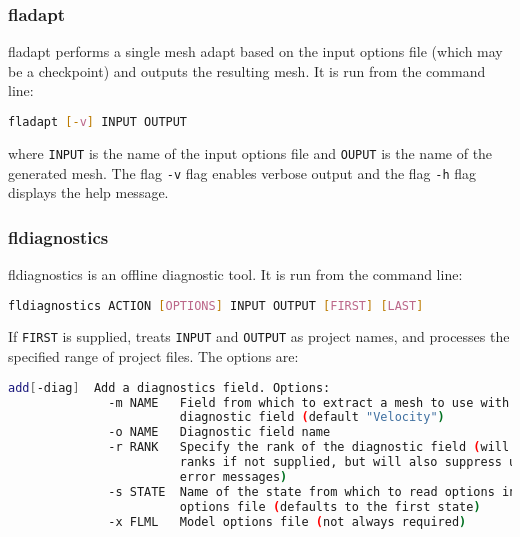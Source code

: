 
\subsubsection{fladapt}
\label{sect:fladapt}
fladapt performs a single mesh adapt based on the input options file (which may be a checkpoint) and outputs the resulting mesh. It is run from the command line:

\begin{lstlisting}[language = Bash]
fladapt [-v] INPUT OUTPUT
\end{lstlisting}
where \lstinline[language = Bash]+INPUT+ is the name of the input options file and \lstinline[language = Bash]+OUPUT+ is the name of the generated mesh. The flag \lstinline[language = Bash]+-v+ flag enables verbose output and the flag \lstinline[language = Bash]+-h+ flag displays the help message.


\subsubsection{fldiagnostics}
\label{sect:fldiagnostics}
fldiagnostics is an offline diagnostic tool. It is run from the command line:

\begin{lstlisting}[language = Bash]
fldiagnostics ACTION [OPTIONS] INPUT OUTPUT [FIRST] [LAST]
\end{lstlisting}

If \lstinline[language = Bash]+FIRST+ is supplied, treats \lstinline[language = Bash]+INPUT+ and \lstinline[language = Bash]+OUTPUT+ as project names, and processes the specified range of project files. The options are:
\begin{lstlisting}[language = Bash]
add[-diag]  Add a diagnostics field. Options:
              -m NAME   Field from which to extract a mesh to use with the
                        diagnostic field (default "Velocity")
              -o NAME   Diagnostic field name
              -r RANK   Specify the rank of the diagnostic field (will try all
                        ranks if not supplied, but will also suppress useful
                        error messages)
              -s STATE  Name of the state from which to read options in the 
                        options file (defaults to the first state)
              -x FLML   Model options file (not always required)
\end{lstlisting}

